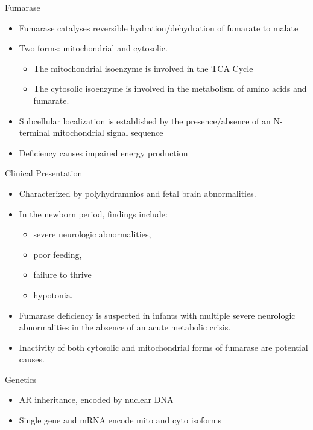\documentclass[presentation, smaller]{beamer}
\begin{document}
\begin{frame}[label={sec:org448f351}]{Fumarase}
\begin{itemize}
\item Fumarase catalyses reversible hydration/dehydration of fumarate to malate
\item Two forms: mitochondrial and cytosolic.
\begin{itemize}
\item The mitochondrial isoenzyme is involved in the TCA Cycle
\item The cytosolic isoenzyme is involved in the metabolism of amino acids and fumarate.
\end{itemize}
\item Subcellular localization is established by the presence/absence of an N-terminal mitochondrial signal
sequence
\item Deficiency causes impaired energy production
\end{itemize}
\end{frame}

\begin{frame}[label={sec:orgfe84ce4}]{Clinical Presentation}
\begin{itemize}
\item Characterized by polyhydramnios and fetal brain abnormalities.
\item In the newborn period, findings include:
\begin{itemize}
\item severe neurologic abnormalities,
\item poor feeding,
\item failure to thrive
\item hypotonia.
\end{itemize}

\item Fumarase deficiency is suspected in infants with multiple severe
neurologic abnormalities in the absence of an acute metabolic
crisis.

\item Inactivity of both cytosolic and mitochondrial forms of
fumarase are potential causes.
\end{itemize}
\end{frame}

\begin{frame}[label={sec:org4fd43d2}]{Genetics}
\begin{itemize}
\item AR inheritance, encoded by nuclear DNA
\item Single gene and mRNA encode mito and cyto isoforms
\end{itemize}
\end{frame}
\end{document}
